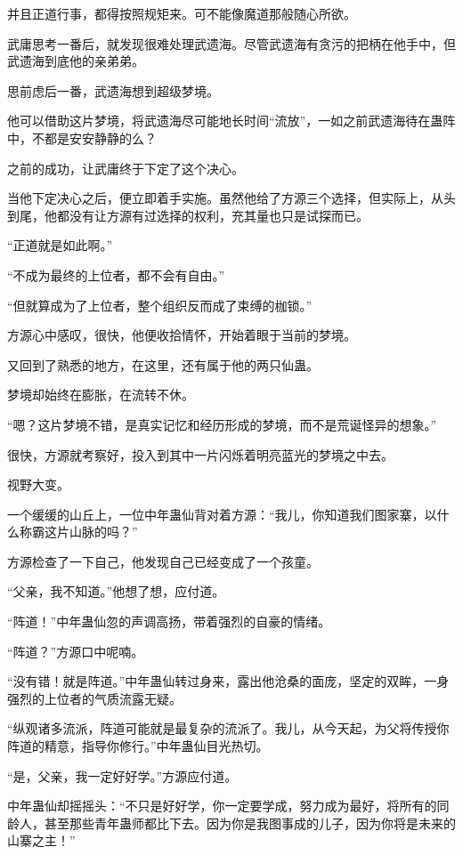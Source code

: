 \begin{this_body}
并且正道行事，都得按照规矩来。可不能像魔道那般随心所欲。

武庸思考一番后，就发现很难处理武遗海。尽管武遗海有贪污的把柄在他手中，但武遗海到底他的亲弟弟。

思前虑后一番，武遗海想到超级梦境。

他可以借助这片梦境，将武遗海尽可能地长时间“流放”，一如之前武遗海待在蛊阵中，不都是安安静静的么？

之前的成功，让武庸终于下定了这个决心。

当他下定决心之后，便立即着手实施。虽然他给了方源三个选择，但实际上，从头到尾，他都没有让方源有过选择的权利，充其量也只是试探而已。

“正道就是如此啊。”

“不成为最终的上位者，都不会有自由。”

“但就算成为了上位者，整个组织反而成了束缚的枷锁。”

方源心中感叹，很快，他便收拾情怀，开始着眼于当前的梦境。

又回到了熟悉的地方，在这里，还有属于他的两只仙蛊。

梦境却始终在膨胀，在流转不休。

“嗯？这片梦境不错，是真实记忆和经历形成的梦境，而不是荒诞怪异的想象。”

很快，方源就考察好，投入到其中一片闪烁着明亮蓝光的梦境之中去。

视野大变。

一个缓缓的山丘上，一位中年蛊仙背对着方源：“我儿，你知道我们图家寨，以什么称霸这片山脉的吗？”

方源检查了一下自己，他发现自己已经变成了一个孩童。

“父亲，我不知道。”他想了想，应付道。

“阵道！”中年蛊仙忽的声调高扬，带着强烈的自豪的情绪。

“阵道？”方源口中呢喃。

“没有错！就是阵道。”中年蛊仙转过身来，露出他沧桑的面庞，坚定的双眸，一身强烈的上位者的气质流露无疑。

“纵观诸多流派，阵道可能就是最复杂的流派了。我儿，从今天起，为父将传授你阵道的精意，指导你修行。”中年蛊仙目光热切。

“是，父亲，我一定好好学。”方源应付道。

中年蛊仙却摇摇头：“不只是好好学，你一定要学成，努力成为最好，将所有的同龄人，甚至那些青年蛊师都比下去。因为你是我图事成的儿子，因为你将是未来的山寨之主！”

\end{this_body}

